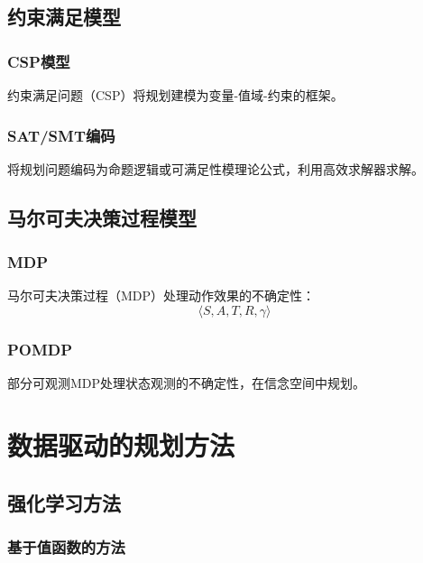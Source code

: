 \documentclass[12pt,a4paper]{ctexart}
\begin{document}
\subsection{约束满足模型}

\subsubsection{CSP模型}

约束满足问题（CSP）将规划建模为变量-值域-约束的框架。

\subsubsection{SAT/SMT编码}

将规划问题编码为命题逻辑或可满足性模理论公式，利用高效求解器求解。

\subsection{马尔可夫决策过程模型}

\subsubsection{MDP}

马尔可夫决策过程（MDP）处理动作效果的不确定性：
\[ \langle S, A, T, R, \gamma \rangle \]

\subsubsection{POMDP}

部分可观测MDP处理状态观测的不确定性，在信念空间中规划。

\section{数据驱动的规划方法}

\subsection{强化学习方法}

\subsubsection{基于值函数的方法}
\end{document}
